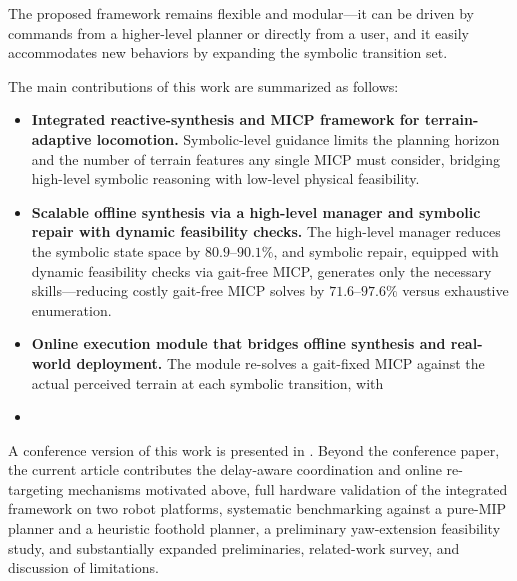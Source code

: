 The proposed framework remains flexible and modular---it can be driven by commands from a higher-level planner \citep{wermelinger2016navigation, fernbach2017kinodynamic,norby2020fast,chignoli2022rapid,liao2023walking,feng2023gpf} or directly from a user, and it easily accommodates new behaviors by expanding the symbolic transition set.

The main contributions of this work are summarized as follows:
\begin{itemize}
    \item \textbf{Integrated reactive-synthesis and MICP framework for terrain-adaptive locomotion.}
    Symbolic-level guidance limits the planning horizon and the number of terrain features any single MICP must consider, bridging high-level symbolic reasoning with low-level physical feasibility.

    \item \textbf{Scalable offline synthesis via a high-level manager and symbolic repair with dynamic feasibility checks.}
    The high-level manager reduces the symbolic state space by $80.9$--$90.1\%$, and symbolic repair, equipped with dynamic feasibility checks via gait-free MICP, generates only the necessary skills---reducing costly gait-free MICP solves by $71.6$--$97.6\%$ versus exhaustive enumeration.

    \item \textbf{Online execution module that bridges offline synthesis and real-world deployment.}
    The module re-solves a gait-fixed MICP against the actual perceived terrain at each symbolic transition, with 

    \item {}
\end{itemize}

A conference version of this work is presented in \citep{zhou2025physically}. Beyond the conference paper, the current article contributes the delay-aware coordination and online re-targeting mechanisms motivated above, full hardware validation of the integrated framework on two robot platforms, systematic benchmarking against a pure-MIP planner and a heuristic foothold planner, a preliminary yaw-extension feasibility study, and substantially expanded preliminaries, related-work survey, and discussion of limitations.


